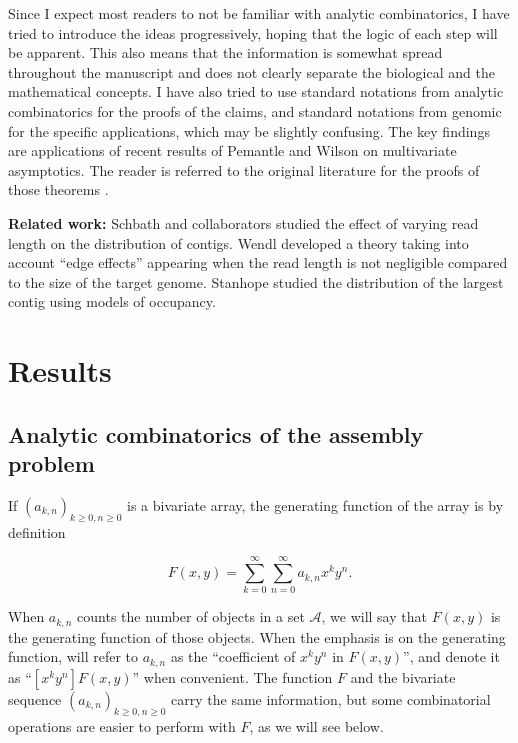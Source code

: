 \documentclass{article}
\begin{document}
Since I expect most readers to not be familiar with analytic
combinatorics, I have tried to introduce the ideas progressively, hoping
that the logic of each step will be apparent. This also means that the
information is somewhat spread throughout the manuscript and does not
clearly separate the biological and the mathematical concepts. I have also
tried to use standard notations from analytic combinatorics for the proofs
of the claims, and standard notations from genomic for the specific
applications, which may be slightly confusing.  The key findings are
applications of recent results of Pemantle and Wilson on multivariate
asymptotics. The reader is referred to the original literature for the
proofs of those theorems \cite{PemWil08,AnalComb2013}.

\textbf{Related work:} Schbath and collaborators \cite{pmid10890387}
studied the effect of varying read length on the distribution of contigs.
Wendl \cite{pmid16901236} developed a theory taking into account ``edge
effects'' appearing when the read length is not negligible compared to the
size of the target genome. Stanhope \cite{pmid20686599} studied the
distribution of the largest contig using models of occupancy.


\section{Results}

\subsection{Analytic combinatorics of the assembly problem}

If $(a_{k,n})_{k \geq 0, n \geq 0}$ is a bivariate array, the generating
function of the array is by definition

\begin{equation*}
F(x,y) = \sum_{k=0}^\infty \sum_{n=0}^\infty a_{k,n}x^ky^n.
\end{equation*}

When $a_{k,n}$ counts the number of objects in a set $\mathcal{A}$, we
will say that $F(x,y)$ is the generating function of those objects. When
the emphasis is on the generating function, will refer to $a_{k,n}$ as the
``coefficient of $x^ky^n$ in $F(x,y)$'', and denote it as ``$[x^ky^n]
F(x,y)$'' when convenient. The function $F$ and the bivariate sequence
$(a_{k,n})_{k \geq 0, n \geq 0}$ carry the same information, but some
combinatorial operations are easier to perform with $F$, as we will see
below.
\end{document}
